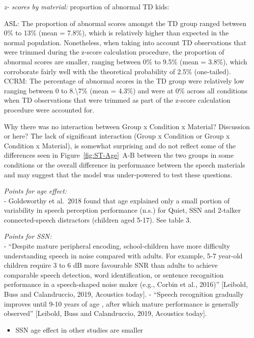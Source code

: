 \documentclass[a4paper, twoside]{templates/ociamthesis}
\providecommand{\tightlist}{%
  \setlength{\itemsep}{0pt}\setlength{\parskip}{0pt}}
\begin{document}
\colorbox[HTML]{CCCCFF}{\emph{z- scores by material:}}
proportion of abnormal TD kids:

ASL:
The proportion of abnormal scores amongst the TD group ranged between 0\% to 13\% (mean = 7.8\%), which is relatively higher than expected in the normal population. Nonetheless, when taking into account TD observations that were trimmed during the z-score calculation procedure, the proportion of abnormal scores are smaller, ranging between 0\% to 9.5\% (mean = 3.8\%), which corroborate fairly well with the theoretical probability of 2.5\% (one-tailed).\\

CCRM:
The percentage of abnormal scores in the TD group were relatively low ranging between 0 to 8.\textbackslash7\% (mean = 4.3\%) and were at 0\% across all conditions when TD observations that were trimmed as part of the z-score calculation procedure were accounted for.

Why there was no interaction between Group x Condition x Material?
\colorbox[HTML]{CCCCFF}{Discussion or here?} The lack of significant interaction (Group x Condition or Group x Condition x Material), is somewhat surprising and do not reflect some of the differences seen in Figure~\ref{fig:ST-Age}~A-B between the two groups in some conditions or the overall difference in performance between the speech materials and may suggest that the model was under-powered to test these questions.

\emph{Points for age effect:}\\
- Goldsworthy et al.~2018 found that age explained only a small portion of variability in speech perception performance (n.s.) for Quiet, SSN and 2-talker connected-speech distractors (children aged 5-17). See table 3.

\emph{Points for SSN:}\\
- ``Despite mature peripheral encoding, school-children have more difficulty understanding speech in noise compared with adults. For example, 5-7 year-old children require 3 to 6 dB more favourable SNR than adults to achieve comparable speech detection, word identification, or sentence recognition performance in a speech-shaped noise maker (e.g., Corbin et al., 2016)'' {[}Leibold, Buss and Calandruccio, 2019, Acoustics today{]}. - ``Speech recognition gradually improves until 9-10 years of age , after which mature performance is generally observed'' {[}Leibold, Buss and Calandruccio, 2019, Acoustics today{]}.

\begin{itemize}
\tightlist
\item
  SSN age effect in other studies are smaller
\end{itemize}
\end{document}
